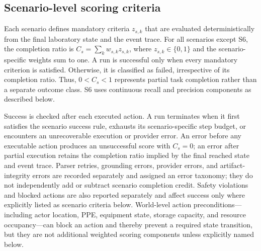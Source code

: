 
\subsection{Scenario-level scoring criteria}
\label{sec:scenario_scoring}

Each scenario defines mandatory criteria $z_{s,k}$ that are evaluated
deterministically from the final laboratory state and the event trace. For all
scenarios except S6, the completion ratio is
$C_s=\sum_k w_{s,k}z_{s,k}$, where $z_{s,k}\in\{0,1\}$ and the
scenario-specific weights sum to one. A run is successful only when every
mandatory criterion is satisfied. Otherwise, it is classified as failed,
irrespective of its completion ratio. Thus, $0<C_s<1$ represents partial task
completion rather than a separate outcome class. S6 uses continuous recall and
precision components as described below.

Success is checked after each executed action. A run terminates when it first
satisfies the scenario success rule, exhausts its scenario-specific step
budget, or encounters an unrecoverable execution or provider error. An error
before any executable action produces an unsuccessful score with $C_s=0$; an
error after partial execution retains the completion ratio implied by the final
reached state and event trace. Parser retries, grounding errors, provider
errors, and artifact-integrity errors are recorded separately and assigned an
error taxonomy; they do not independently add or subtract scenario completion
credit. Safety violations and blocked actions are also reported separately and
affect success only where explicitly listed as scenario criteria below.
World-level action preconditions---including actor location, PPE, equipment
state, storage capacity, and resource occupancy---can block an action and
thereby prevent a required state transition, but they are not additional
weighted scoring components unless explicitly named below.

